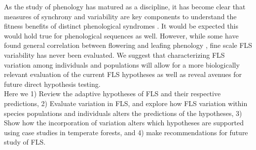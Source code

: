 \documentclass[12pt]{article}\usepackage[]{graphicx}\usepackage[]{color}
\begin{document}
\indent As the study of phenology has matured as a discipline, it has become clear that measures of synchrony and variability are key components to understand the fitness benefits of distinct phenological syndromes \citep{}. It would be expected this would hold true for phenological sequences as well. However, while some have found general correlation between flowering and leafing phenology \citep{Lechowicz_1995, Ettinger2018}, fine scale FLS variability has never been evaluated. We suggest that characterizing FLS variation among individuals and populations will allow for a more biologically relevant evaluation of the current FLS hypotheses as well as reveal avenues for future direct hypothesis testing.\\
\indent Here we 1) Review the adaptive hypotheses of FLS and their respective predictions, 2) Evaluate variation in FLS, and explore how FLS variation within species populations and individuals alters the predictions of the hypotheses, 3) Show how the incorporation of variation alters which hypotheses are supported using case studies in temperate forests, and 4) make recommendations for future study of FLS. 
\end{document}
